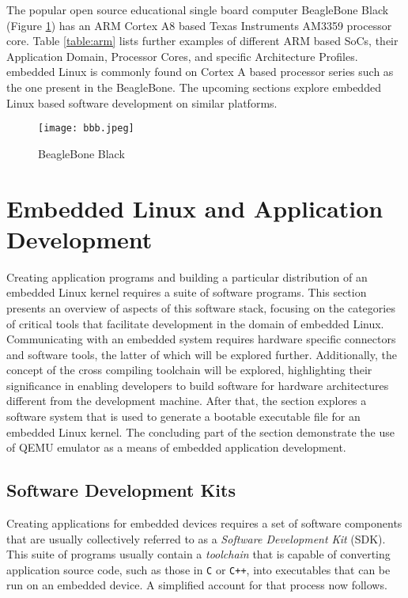 The popular open source educational single board computer BeagleBone Black (Figure \ref{fig:bbb}) has an ARM Cortex A8 based Texas Instruments AM3359 processor core. Table \ref{table:arm} lists further examples of different ARM based SoCs, their Application Domain, Processor Cores, and specific Architecture Profiles. embedded Linux is commonly found on Cortex A based processor series such as the one present in the BeagleBone. The upcoming sections explore embedded Linux based software development on similar platforms.

\begin{figure}[h]
	\centering
	\texttt{[image: bbb.jpeg]}
	\caption{BeagleBone Black}
	\label{fig:bbb}
\end{figure}

\section{Embedded Linux and Application Development}

Creating application programs and building a particular distribution of an embedded Linux kernel requires a suite of software programs. This section presents an overview of aspects of this software stack, focusing on the categories of critical tools that facilitate development in the domain of embedded Linux. Communicating with an embedded system requires hardware specific connectors and software tools, the latter of which will be explored further. Additionally, the concept of the cross compiling toolchain will be explored, highlighting their significance in enabling developers to build software for hardware architectures different from the development machine. After that, the section explores a software system that is used to generate a bootable executable file for an embedded Linux kernel. The concluding part of the section demonstrate the use of QEMU emulator as a means of embedded application development.

\subsection{Software Development Kits}

Creating applications for embedded devices requires a set of software components that are usually collectively referred to as a \textit{Software Development Kit} (SDK). This suite of programs usually contain a \textit{toolchain} that is capable of converting application source code, such as those in \texttt{C}  or \texttt{C++}, into executables that can be run on an embedded device. A simplified account for that process now follows.

